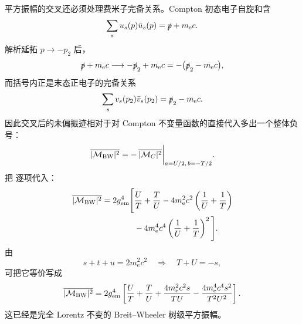 \begin{derivation}
平方振幅的交叉还必须处理费米子完备关系。Compton 初态电子自旋和含
\begin{equation*}
 \sum_su_s(p)\bar u_s(p)=\slashed p+m_{\mathrm e} c.
\end{equation*}
解析延拓 $p\to-p_2$ 后，
\begin{equation*}
 \slashed p+m_{\mathrm e} c
 \longrightarrow
 -\slashed p_2+m_{\mathrm e} c
 =-\bigl(\slashed p_2-m_{\mathrm e} c\bigr),
\end{equation*}
而括号内正是末态正电子的完备关系
\begin{equation*}
 \sum_sv_s(p_2)\bar v_s(p_2)=\slashed p_2-m_{\mathrm e} c.
\end{equation*}
因此交叉后的未偏振迹相对于对 Compton 不变量函数的直接代入多出一个整体负号：
\begin{equation*}
 \overline{|\mathcal M_{\rm BW}|^2}
 =-\,\overline{|\mathcal M_C|^2}
 \bigg|_{a=U/2,\,b=-T/2}.
\end{equation*}
把 逐项代入：
\begin{align*}
 \overline{|\mathcal M_{\rm BW}|^2}
 =2g_{\rm em}^4\Bigg[
 &\frac UT+\frac TU
 -4m_{\mathrm e}^2c^2\left(\frac1U+\frac1T\right)\\
 &-4m_{\mathrm e}^4c^4\left(\frac1U+\frac1T\right)^2
 \Bigg].
\end{align*}
由
\begin{equation*}
 s+t+u=2m_{\mathrm e}^2c^2
 \quad\Longrightarrow\quad
 T+U=-s,
\end{equation*}
可把它等价写成
\begin{equation*}
 \overline{|\mathcal M_{\rm BW}|^2}
 =2g_{\rm em}^4\left[
 \frac UT+\frac TU
 +\frac{4m_{\mathrm e}^2c^2s}{TU}
 -\frac{4m_{\mathrm e}^4c^4s^2}{T^2U^2}
 \right].
\end{equation*}
这已经是完全 Lorentz 不变的 Breit--Wheeler 树级平方振幅。


\end{derivation}

